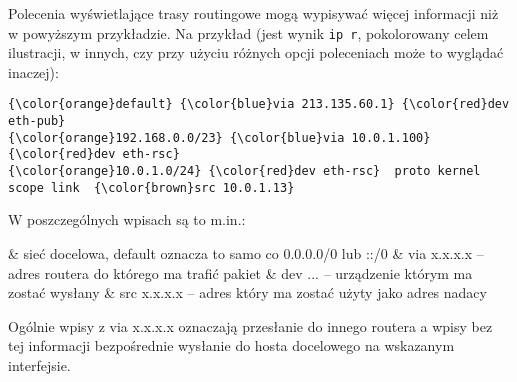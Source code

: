 Polecenia wyświetlające trasy routingowe mogą wypisywać więcej informacji niż w powyższym przykładzie.
Na przykład (jest wynik \Verb$ip r$, pokolorowany celem ilustracji, w innych, czy przy użyciu różnych opcji poleceniach może to wyglądać inaczej):
\begin{Verbatim}[commandchars=\\\{\},commentchar=\%]
{\color{orange}default} {\color{blue}via 213.135.60.1} {\color{red}dev eth-pub}
{\color{orange}192.168.0.0/23} {\color{blue}via 10.0.1.100} {\color{red}dev eth-rsc}
{\color{orange}10.0.1.0/24} {\color{red}dev eth-rsc}  proto kernel  scope link  {\color{brown}src 10.0.1.13}
\end{Verbatim}
W poszczególnych wpisach są to m.in.:
\begin{easylist}[itemize]
	& {\color{orange}sieć docelowa}, {\color{orange}default} oznacza to samo co {\color{orange}0.0.0.0/0} lub {\color{orange}::/0}
	& {\color{blue}via x.x.x.x} – adres routera do którego ma trafić pakiet
	& {\color{red}dev ...} – urządzenie którym ma zostać wysłany
	& {\color{brown}src x.x.x.x} – adres który ma zostać użyty jako adres nadacy
\end{easylist}
Ogólnie wpisy z {\color{blue}via x.x.x.x} oznaczają przesłanie do innego routera a wpisy bez tej informacji bezpośrednie wysłanie do hosta docelowego na wskazanym interfejsie.
